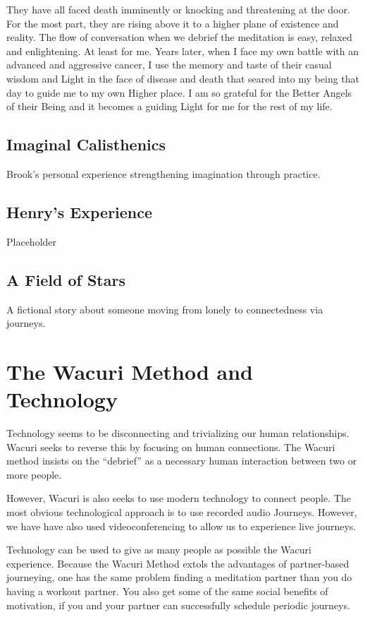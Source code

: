 \documentclass[12pt]{book}
\begin{document}
They have all faced death imminently or knocking and threatening at the door. For the most part, they are rising above it to a higher plane of existence and reality. The flow of conversation when we debrief the meditation is easy, relaxed and enlightening. At least for me. Years later, when I face my own battle with an advanced and aggressive cancer, I use the memory and taste of their casual wisdom and Light in the face of disease and death that seared into my being that day to guide me to my own Higher place. I am so grateful for the Better Angels of their Being and it becomes a guiding Light for me for the rest of my life.


\section{Imaginal Calisthenics}

Brook's personal experience strengthening imagination through practice.

\section{Henry's Experience}

Placeholder 

\section{A Field of Stars}

A fictional story about someone moving from lonely to connectedness via journeys.
\chapter{The Wacuri Method and Technology}

Technology seems to be disconnecting and trivializing our human relationships.
Wacuri seeks to reverse this by focusing on human connections. The Wacuri method
insists on the ``debrief'' as a necessary human interaction between two or more people.

However, Wacuri is also seeks to use modern technology to connect people.
The most obvious technological approach is to use recorded audio Journeys.
However, we have have also used videoconferencing to allow us to experience live journeys.

Technology can be used to give as many people as possible the Wacuri experience.
Because the Wacuri Method extols the advantages of partner-based journeying,
one has the same problem finding a meditation partner than you do having a
workout partner. You also get some of the same social benefits of motivation,
if you and your partner can successfully schedule periodic journeys.
\end{document}
